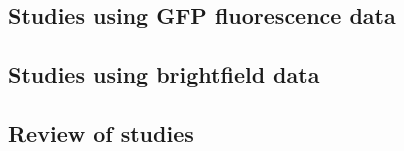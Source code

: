 \subsection{Studies using GFP fluorescence data}


\subsection{Studies using brightfield data}


\subsection{Review of studies}
